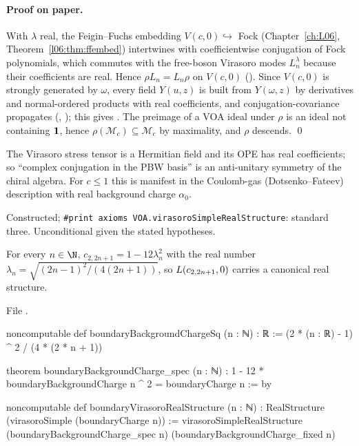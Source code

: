 \paragraph{Proof on paper.} With $\lambda$ real, the Feigin--Fuchs embedding $V(c,0)\hookrightarrow$ Fock
(Chapter~\ref{ch:L06}, Theorem~\ref{l06:thm:ffembed}) intertwines  with coefficientwise
conjugation of Fock polynomials, which commutes with the free-boson Virasoro modes $L_n^\lambda$ because
their coefficients are real. Hence $\rho L_n = L_n\rho$ on $V(c,0)$ (). Since
$V(c,0)$ is strongly generated by $\omega$, every field $Y(u,z)$ is built from $Y(\omega,z)$ by
derivatives and normal-ordered products with real coefficients, and conjugation-covariance propagates
(, ); this gives . The preimage of a VOA
ideal under $\rho$ is an ideal not containing $\mathbf{1}$, hence $\rho(\mathcal M_c)\subseteq\mathcal M_c$
by maximality, and $\rho$ descends. \qed

\begin{physics}
The Virasoro stress tensor is a Hermitian field and its OPE has real coefficients; so ``complex
conjugation in the PBW basis'' is an anti-unitary symmetry of the chiral algebra. For $c\le1$ this is
manifest in the Coulomb-gas (Dotsenko--Fateev) description with real background charge $\alpha_0$.
\end{physics}

\begin{status}
Constructed; \texttt{\#print axioms VOA.virasoroSimpleRealStructure}: standard three. Unconditional
given the stated hypotheses.
\end{status}

\begin{theorem}\label{l19:thm:boundaryreal}
For every $n\in\N$, $c_{2,2n+1} = 1-12\lambda_n^2$ with the real number
$\lambda_n = \sqrt{(2n-1)^2/(4(2n+1))}$, so $L(c_{2,2n+1},0)$ carries a canonical real structure.
\end{theorem}

\noindent File .
\begin{leancode}
noncomputable def boundaryBackgroundChargeSq (n : ℕ) : ℝ :=
  (2 * (n : ℝ) - 1) ^ 2 / (4 * (2 * n + 1))

theorem boundaryBackgroundCharge_spec (n : ℕ) :
    1 - 12 * boundaryBackgroundCharge n ^ 2 = boundaryCharge n := by

noncomputable def boundaryVirasoroRealStructure (n : ℕ) :
    RealStructure (virasoroSimple (boundaryCharge n)) :=
  virasoroSimpleRealStructure (boundaryBackgroundCharge_spec n)
    (boundaryBackgroundCharge_fixed n)
\end{leancode}

